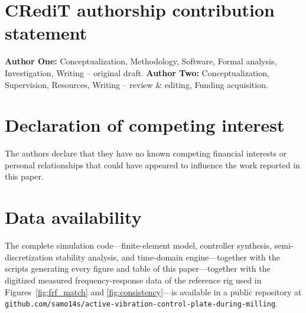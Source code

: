 \documentclass[preprint,12pt]{elsarticle}
\begin{document}
\section*{CRediT authorship contribution statement}
\textbf{Author One:} Conceptualization, Methodology, Software, Formal
analysis, Investigation, Writing -- original draft.
\textbf{Author Two:} Conceptualization, Supervision, Resources, Writing
-- review \& editing, Funding acquisition.

\section*{Declaration of competing interest}
The authors declare that they have no known competing financial
interests or personal relationships that could have appeared to
influence the work reported in this paper.

\section*{Data availability}
The complete simulation code---finite-element model, controller
synthesis, semi-discretization stability analysis, and time-domain
engine---together with the scripts generating every figure and table of
this paper---together with the digitized measured frequency-response
data of the reference rig used in
Figures~\ref{fig:frf_match} and \ref{fig:consistency}---is available
in a public repository at
\texttt{github.com/samo14s/active-vibration-control-plate-during-milling}.



\end{document}

